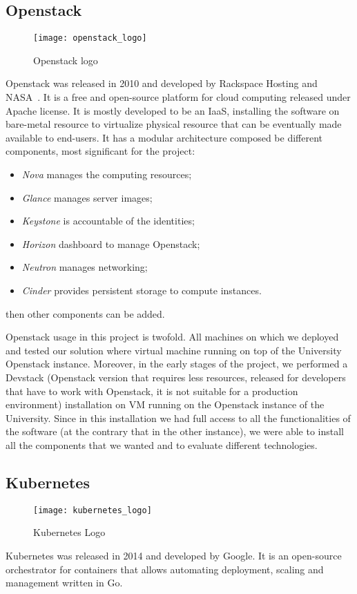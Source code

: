 \subsection{Openstack}
\begin{figure}[t]
  \centering \texttt{[image: openstack\_logo]}
  \caption{Openstack logo}
  \label{chap:prjan:img:openstack_logo}
\end{figure}
Openstack was released in 2010 and developed by Rackspace Hosting and
NASA~\cite{openstackWebsite}. It is a free and open-source platform for cloud
computing released under Apache license. It is mostly developed to be an IaaS,
installing the software on bare-metal resource to virtualize physical resource
that can be eventually made available to end-users. It has a modular
architecture composed be different components, most significant for the project:
\begin{itemize}
\item \emph{Nova} manages the computing resources;
\item \emph{Glance} manages server images;
\item \emph{Keystone} is accountable of the identities;
\item \emph{Horizon} dashboard to manage Openstack;
\item \emph{Neutron} manages networking;
\item \emph{Cinder} provides persistent storage to compute instances.
\end{itemize}
then other components can be added.

Openstack usage in this project is twofold. All machines on which we deployed
and tested our solution where virtual machine running on top of the University
Openstack instance. Moreover, in the early stages of the project, we performed
a Devstack (Openstack version that requires less resources, released for
developers that have to work with Openstack, it is not suitable for a production
environment) installation on VM running on the Openstack instance of
the University. Since in this installation we had full access to all the
functionalities of the software (at the contrary that in the other instance), we
were able to install all the components that we wanted and to evaluate different
technologies.


\subsection{Kubernetes}
\begin{figure}[h]
  \centering \texttt{[image: kubernetes\_logo]}
  \caption{Kubernetes Logo}
  \label{chap:intro:img:k8s_logo}
\end{figure}
Kubernetes was released in 2014 and developed by Google. It is an open-source
orchestrator for containers that allows automating deployment, scaling and
management written in Go.


